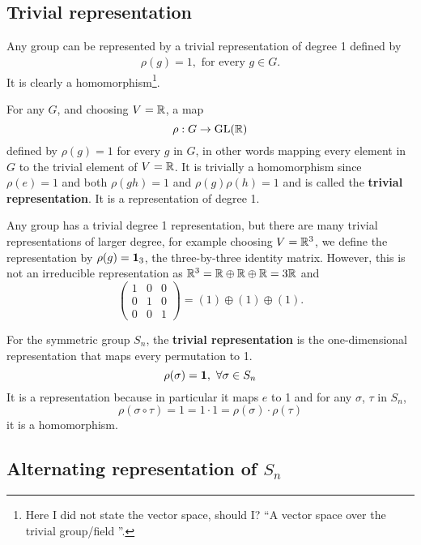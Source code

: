\subsection{Trivial representation}

	Any group can be represented by a trivial representation of degree 1 defined by 
	\begin{align}
		\rho(g) = 1, \text{ for every } g \in G.
	\end{align}
	It is clearly a homomorphism\footnote{Here I did not state the vector space, should I? ``A vector space over the trivial group/field	''.}. 
	
	For any $G$, and choosing $V = \mathbb{R}$, a map
	\[
	\rho: G \rightarrow \text{GL}(\mathbb{R})
	\]
	defined by $ \rho(g) = 1$ for every $g$ in $G$, in other words mapping every element in $G$ to the trivial element of $V = \mathbb{R}$. It is trivially a homomorphism since $\rho(e)=1$ and both $\rho(gh)=1$ and $\rho(g)\rho(h)=1$ and is called the \textbf{trivial representation}. It is a representation of degree 1.
	
	
	Any group has a trivial degree 1 representation, but there are many trivial representations of larger degree, for example choosing $V = \mathbb{R}^3$, we define the representation by $\rho(g) = \mathbf{1}_3$, the three-by-three identity matrix. However, this is not an irreducible representation as $\mathbb{R}^3 = \mathbb{R} \oplus \mathbb{R} \oplus \mathbb{R} = 3\mathbb{R}$ and
	\[
	\begin{pmatrix} 1&0&0\\0&1&0\\0&0&1 \end{pmatrix} = (1)\oplus(1)\oplus(1).
	\]
	
	For the symmetric group $S_n$, the \textbf{trivial representation} is the one-dimensional representation that maps every permutation to 1.
	\[
	\rho(\sigma) = \mathbf{1}, \ \forall \sigma \in S_n
	\]
	It is a representation because in particular it maps $e$ to 1 and for any $\sigma$, $\tau$ in $S_n$,
	\[
	\rho(\sigma \circ \tau) = 1 = 1 \cdot 1 = \rho(\sigma) \cdot \rho(\tau)
	\]
	it is a homomorphism.

\subsection{Alternating representation of $S_n$}

